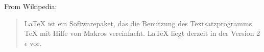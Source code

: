 \newenvironment{myquote}[1]{
	From #1:
	\begin{quote}
}{	
	\end{quote}
}
 
\begin{myquote}{Wikipedia}
	{\LaTeX} ist ein Softwarepaket, das die Benutzung des Textsatzprogramms TeX mit Hilfe von Makros vereinfacht. LaTeX liegt derzeit in der Version 2$\epsilon$ vor.
\end{myquote}
